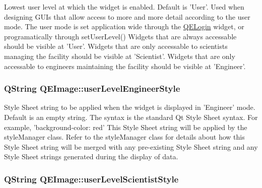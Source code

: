 \label{classQEImage_a25b8ba9d335dce7a4fd1eb9de3c62446}
Lowest user level at which the widget is enabled. Default is 'User'. Used when designing GUIs that allow access to more and more detail according to the user mode. The user mode is set application wide through the \hyperlink{classQELogin}{QELogin} widget, or programatically through setUserLevel() Widgets that are always accessable should be visible at 'User'. Widgets that are only accessable to scientists managing the facility should be visible at 'Scientist'. Widgets that are only accessable to engineers maintaining the facility should be visible at 'Engineer'. \hypertarget{classQEImage_abc791a3195ff70845933dd213439fc69}{
\subsubsection[{userLevelEngineerStyle}]{\setlength{\rightskip}{0pt plus 5cm}QString QEImage::userLevelEngineerStyle}}
\label{classQEImage_abc791a3195ff70845933dd213439fc69}
Style Sheet string to be applied when the widget is displayed in 'Engineer' mode. Default is an empty string. The syntax is the standard Qt Style Sheet syntax. For example, 'background-\/color: red' This Style Sheet string will be applied by the styleManager class. Refer to the styleManager class for details about how this Style Sheet string will be merged with any pre-\/existing Style Sheet string and any Style Sheet strings generated during the display of data. \hypertarget{classQEImage_abeafe47e5e31d857f6a0f7786261a4c3}{
\subsubsection[{userLevelScientistStyle}]{\setlength{\rightskip}{0pt plus 5cm}QString QEImage::userLevelScientistStyle}}
\label{classQEImage_abeafe47e5e31d857f6a0f7786261a4c3}
